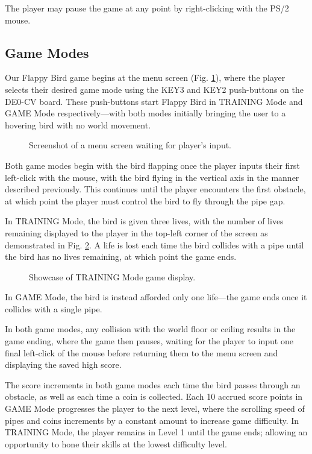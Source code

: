 \documentclass[conference]{IEEEtran}
\begin{document}
The player may pause the game at any point by right-clicking with the PS/2 mouse.

\subsection{Game Modes}

Our Flappy Bird game begins at the menu screen (Fig. \ref{fig:menu-screen}), where the player selects their desired game mode using the KEY3 and KEY2 push-buttons on the DE0-CV board. These push-buttons start Flappy Bird in TRAINING Mode and GAME Mode respectively—with both modes initially bringing the user to a hovering bird with no world movement.

\begin{figure}[htbp]
	\caption{Screenshot of a menu screen waiting for player's input.}
	\label{fig:menu-screen}
\end{figure}

Both game modes begin with the bird flapping once the player inputs their first left-click with the mouse, with the bird flying in the vertical axis in the manner described previously. This continues until the player encounters the first obstacle, at which point the player must control the bird to fly through the pipe gap.

In TRAINING Mode, the bird is given three lives, with the number of lives remaining displayed to the player in the top-left corner of the screen as demonstrated in Fig. \ref{fig:training-mode}. A life is lost each time the bird collides with a pipe until the bird has no lives remaining, at which point the game ends.

\begin{figure}[htbp]
	\caption{Showcase of TRAINING Mode game display.}
	\label{fig:training-mode}
\end{figure}

In GAME Mode, the bird is instead afforded only one life—the game ends once it collides with a single pipe.

In both game modes, any collision with the world floor or ceiling results in the game ending, where the game then pauses, waiting for the player to input one final left-click of the mouse before returning them to the menu screen and displaying the saved high score.

The score increments in both game modes each time the bird passes through an obstacle, as well as each time a coin is collected. Each 10 accrued score points in GAME Mode progresses the player to the next level, where the scrolling speed of pipes and coins increments by a constant amount to increase game difficulty. In TRAINING Mode, the player remains in Level 1 until the game ends; allowing an opportunity to hone their skills at the lowest difficulty level.
\end{document}
